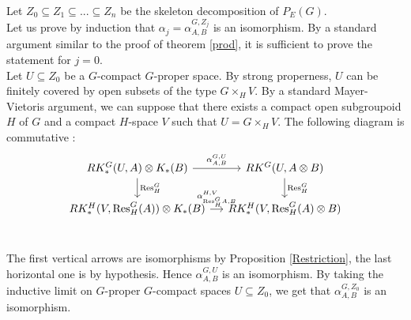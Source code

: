 \begin{dem}
Let $Z_0\subseteq Z_1\subseteq ... \subseteq Z_n $ be the skeleton decomposition of $P_E(G)$.\\

Let us prove by induction that $\alpha_j=\alpha^{G,Z_j}_{A,B}$ is an isomorphism. By a standard argument similar to the proof of theorem \ref{prod}, it is sufficient to prove the statement for $j=0$.\\

Let $U\subseteq Z_0$ be a $G$-compact $G$-proper space. By strong properness, $U$ can be finitely covered by open subsets of the type $G \times_H V$. By a standard Mayer-Vietoris argument, we can suppose that there exists a compact open subgroupoid $H$ of $G$ and a compact $H$-space $V$ such that $U = G \times_H V$. The following diagram is commutative :
\[\begin{tikzcd}[column sep = small] 
RK_*^G(U,A)\otimes K_*(B) \arrow{r}{\alpha_{A,B}^{G,U}} \arrow{d}{\text{Res}_H^G} & RK^G(U, A\otimes B) \arrow{d}{\text{Res}_H^G}\\
RK_*^H(V, \text{Res}_H^G (A))\otimes K_*(B) \arrow{r}{\alpha_{\text{Res}_H^G A,B}^{H,V}} & 
	RK_*^H(V, \text{Res}_H^G (A)\otimes B)\\
\end{tikzcd}\]

The first vertical arrows are isomorphisms by Proposition \ref{Restriction}, the last horizontal one is by hypothesis. Hence $\alpha_{A,B}^{G,U}$ is an isomorphism. By taking the inductive limit on $G$-proper $G$-compact spaces $U\subseteq Z_0$, we get that $\alpha_{A,B}^{G,Z_0}$ is an isomorphism.
\end{dem}

